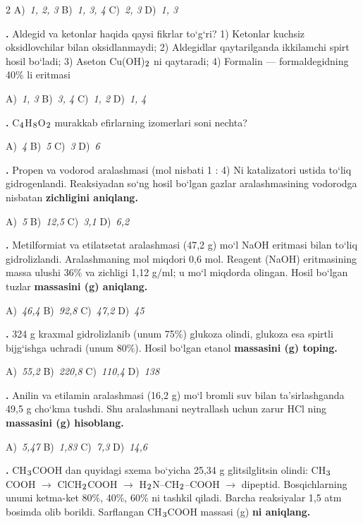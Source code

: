 \documentclass[11pt,a4paper]{article}
\renewcommand{\textsubscript}[1]{\ensuremath{_{\text{\fontsize{8}{8}\selectfont #1}}}}
\newcommand{\qn}[1]{\textbf{\fontsize{11.5}{13}\selectfont #1}}
\newcommand{\qsep}{\par\vspace{13pt}}
\begin{document}
\begin{multicols}{2}
\noindent A)~\textsl{1, 2, 3} \hfill B)~\textsl{1, 3, 4} \hfill C)~\textsl{2, 3} \hfill D)~\textsl{1, 3}\par
\qsep
\noindent\qn{21.} Aldegid va ketonlar haqida qaysi fikrlar to`g`ri? 1) Ketonlar kuchsiz oksidlovchilar bilan oksidlanmaydi; 2) Aldegidlar qaytarilganda ikkilamchi spirt hosil bo`ladi; 3) Aseton Cu(OH)\textsubscript{2} ni qaytaradi; 4) Formalin --- formaldegidning 40\% li eritmasi

\noindent A)~\textsl{1, 3} \hfill B)~\textsl{3, 4} \hfill C)~\textsl{1, 2} \hfill D)~\textsl{1, 4}\par
\qsep
\noindent\qn{22.} C\textsubscript{4}H\textsubscript{8}O\textsubscript{2} murakkab efirlarning izomerlari soni nechta?

\noindent A)~\textsl{4} \hfill B)~\textsl{5} \hfill C)~\textsl{3} \hfill D)~\textsl{6}\par
\qsep
\noindent\qn{23.} Propen va vodorod aralashmasi (mol nisbati 1 : 4) Ni katalizatori ustida to`liq gidrogenlandi. Reaksiyadan so`ng hosil bo`lgan gazlar aralashmasining vodorodga nisbatan \textbf{zichligini aniqlang.}

\noindent A)~\textsl{5} \hfill B)~\textsl{12,5} \hfill C)~\textsl{3,1} \hfill D)~\textsl{6,2}\par
\qsep
\noindent\qn{24.} Metilformiat va etilatsetat aralashmasi (47,2 g) mo`l NaOH eritmasi bilan to`liq gidrolizlandi. Aralashmaning mol miqdori 0,6 mol. Reagent (NaOH) eritmasining massa ulushi 36\% va zichligi 1,12 g/ml; u mo`l miqdorda olingan. Hosil bo`lgan tuzlar \textbf{massasini (g) aniqlang.}

\noindent A)~\textsl{46,4} \hfill B)~\textsl{92,8} \hfill C)~\textsl{47,2} \hfill D)~\textsl{45}\par
\qsep
\noindent\qn{25.} 324 g kraxmal gidrolizlanib (unum 75\%) glukoza olindi, glukoza esa spirtli bijg`ishga uchradi (unum 80\%). Hosil bo`lgan etanol \textbf{massasini (g) toping.}

\noindent A)~\textsl{55,2} \hfill B)~\textsl{220,8} \hfill C)~\textsl{110,4} \hfill D)~\textsl{138}\par
\qsep
\noindent\qn{26.} Anilin va etilamin aralashmasi (16,2 g) mo`l bromli suv bilan ta'sirlashganda 49,5 g cho`kma tushdi. Shu aralashmani neytrallash uchun zarur HCl ning \textbf{massasini (g) hisoblang.}

\noindent A)~\textsl{5,47} \hfill B)~\textsl{1,83} \hfill C)~\textsl{7,3} \hfill D)~\textsl{14,6}\par
\qsep
\noindent\qn{27.} CH\textsubscript{3}COOH dan quyidagi sxema bo`yicha 25,34 g glitsilglitsin olindi: CH\textsubscript{3}COOH $\to$ ClCH\textsubscript{2}COOH $\to$ H\textsubscript{2}N--CH\textsubscript{2}--COOH $\to$ dipeptid. Bosqichlarning unumi ketma-ket 80\%, 40\%, 60\% ni tashkil qiladi. Barcha reaksiyalar 1,5 atm bosimda olib borildi. Sarflangan CH\textsubscript{3}COOH massasi (g) \textbf{ni aniqlang.}


\end{multicols}
\end{document}
